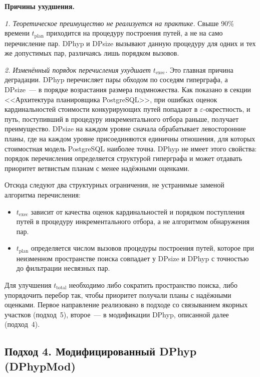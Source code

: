 \textbf{Причины ухудшения.}
\par

\textit{1. Теоретическое преимущество не реализуется на практике.}
Свыше 90\% времени $t_{\mathrm{plan}}$ приходится на процедуру
построения путей, а не на само перечисление пар.
DPhyp и DPsize вызывают данную процедуру для одних и тех же допустимых пар,
различаясь лишь порядком вызовов.
\par

\textit{2. Изменённый порядок перечисления ухудшает $t_{\mathrm{exec}}$.}
Это главная причина деградации.
DPhyp перечисляет пары обходом по соседям гиперграфа,
а DPsize~--- в порядке возрастания размера подмножества.
Как показано в секции <<Архитектура планировщика PostgreSQL>>,
при ошибках оценок кардинальностей стоимости конкурирующих путей
попадают в $\varepsilon$-окрестность, и путь, поступивший
в процедуру инкрементального отбора раньше, получает преимущество.
DPsize на каждом уровне сначала обрабатывает левосторонние планы, где на каждом уровне 
присоединяются единичны отношения, для которых стоимостная модель PostgreSQL наиболее
точна.
DPhyp не имеет этого свойства: порядок перечисления определяется
структурой гиперграфа и может отдавать приоритет ветвистым планам
с менее надёжными оценками.
\par

Отсюда следуют два структурных ограничения,
не устранимые заменой алгоритма перечисления:
\begin{itemize}
    \item $t_{\mathrm{exec}}$  зависит от качества оценок кардинальностей
    и порядком поступления путей в процедуру инкрементального отбора,
    а не алгоритмом обнаружения пар.
    \item $t_{\mathrm{plan}}$ определяется числом вызовов процедуры
    построения путей, которое при неизменном пространстве поиска
    совпадает у DPsize и DPhyp с точностью до фильтрации несвязных пар.
\end{itemize}
Для улучшения $t_{\mathrm{total}}$ необходимо либо сократить пространство
поиска, либо  упорядочить перебор так, чтобы приоритет
получали планы с надёжными оценками. Первое направление реализовано
в подходе со связыванием якорных участков (подход~5), второе~--- в модификации
DPhyp, описанной далее (подход~4).
\par


\subsection{Подход 4. Модифицированный DPhyp (DPhypMod)}

